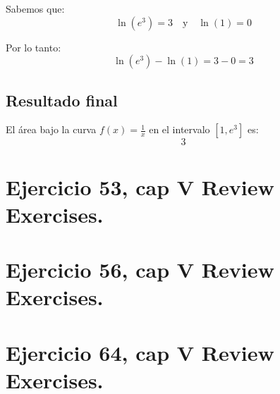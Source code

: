 \documentclass[11pt,letterpaper]{article}
\begin{document}
Sabemos que:
\[
\ln(e^3) = 3 \quad \text{y} \quad \ln(1) = 0
\]

Por lo tanto:
\[
\ln(e^3) - \ln(1) = 3 - 0 = 3
\]

\subsection*{Resultado final}
El área bajo la curva \(f(x) = \frac{1}{x}\) en el intervalo \([1, e^3]\) es:
\[
\boxed{3}
\]


\section{Ejercicio 53, cap V Review Exercises.}

\section{Ejercicio 56, cap V Review Exercises.}

\section{Ejercicio 64, cap V Review Exercises.}

\end{document}
